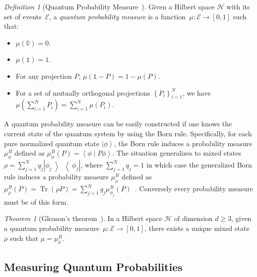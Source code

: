 \documentclass{article}
\theoremstyle{remark}
\newtheorem{definition}{Definition}
\newtheorem{thm}{Theorem}
\newcommand{\Hilb}{\mathcal{H}}
\newcommand{\events}{\ensuremath{\mathcal{E}}}
\newcommand{\ket}[1]{{\left\vert{#1}\right\rangle}}
\newcommand{\op}[2]{\ensuremath{\left\vert{#1}\middle\rangle\middle\langle{#2}\right\vert}}
\newcommand{\proj}[1]{\op{#1}{#1}}
\newcommand{\ip}[2]{\ensuremath{\left\langle{#1}\middle\vert{#2}\right\rangle}}
\newcommand{\Tr}{\mathop{\mathrm{Tr}}\nolimits}
\begin{document}
\begin{definition}[Quantum Probability Measure~\cite{10.2307/2308516,gleason1957,Redhead1987-REDINA,Maassen2010}]\label{def:QuantumProbabilitySpace}
Given a Hilbert space $\Hilb$ with its set of events~$\events$,
a \emph{quantum probability measure} is a function~$\mu:\events\rightarrow[0,1]$
such that: 
\begin{itemize}
\item $\mu(\mathbb{0})=0$. 
\item $\mu(\mathbb{1})=1$. 
\item For any projection $P$, $\mu\left(\mathbb{1}-P\right)=1-\mu\left(P\right)$.
\item For a set of mutually orthogonal projections $\left\{ P_{i}\right\} _{i=1}^{N}$,
we have $\mu\left(\sum_{i=1}^{N}P_{i}\right)=\sum_{i=1}^{N}\mu\left(P_{i}\right)$.
\end{itemize}
\end{definition}

\noindent A quantum probability measure can be easily constructed if
one knows the current state of the quantum system by using the Born
rule.  Specifically, for each
pure normalized quantum state $\ket{\phi}$, the Born rule induces a
probability measure $\mu_{\phi}^{B}$ defined as
$\mu_{\phi}^{B}(P)=\ip{\phi}{P\phi}$. The situation generalizes to
mixed states $\rho = \sum_{j=1}^{N}q_{j}\proj{\phi_{j}}$, where
$\sum_{j=1}^{N}q_{j}=1$ in which case the generalized Born rule
induces a probability measure $\mu_{\rho}^{B}$ defined
as
$\mu_{\rho}^{B}\left(P\right) = \Tr\left(\rho P\right) =
\sum_{j=1}^{N}
q_{j}\mu_{\phi_{j}}^{B}\left(P\right)$~\cite{peres1995quantum,544199,Jaeger2007}.
Conversely every probability measure must be of this form.

\begin{thm}[Gleason's
  theorem~\cite{gleason1957,Redhead1987-REDINA,peres1995quantum}]\label{cor:Gleason's}In
a Hilbert space $\Hilb$ of dimension $d\geq3$, given a quantum probability
measure~$\mu:\events\rightarrow[0,1]$, there exists a unique mixed
state~$\rho$ such that $\mu=\mu_{\rho}^{B}$.
\end{thm}

\subsection{Measuring Quantum Probabilities}
\end{document}
